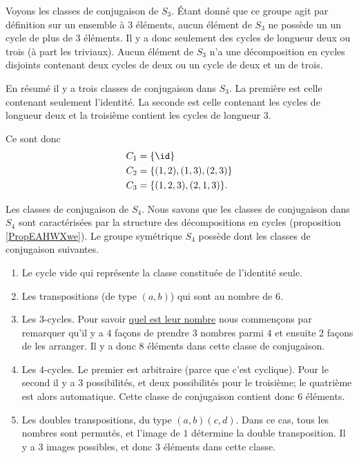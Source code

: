 \begin{example}     \label{EXooQAXRooBsPURs}
    Voyons les classes de conjugaison de \( S_3\). Étant donné que ce groupe agit par définition sur un ensemble à \( 3\) éléments, aucun élément de \( S_3\) ne possède un un cycle de plus de \( 3\) éléments. Il y a donc seulement des cycles de longueur deux ou trois (à part les triviaux). Aucun élément de \( S_3\) n'a une décomposition en cycles disjoints contenant deux cycles de deux ou un cycle de deux et un de trois.

    En résumé il y a trois classes de conjugaison dans \( S_3\). La première est celle contenant seulement l'identité. La seconde est celle contenant les cycles de longueur deux et la troisième contient les cycles de longueur \( 3\).

    Ce sont donc
    \begin{subequations}
        \begin{align}
            C_1&=\{ \id \}\\
            C_2&=\{ (1,2),(1,3),(2,3) \}\\
            C_3&=\{ (1,2,3),(2,1,3) \}.
        \end{align}
    \end{subequations}
\end{example}

\begin{example} \label{ExVYZPzub}
    Les classes de conjugaison de \( S_4\). Nous savons que les classes de conjugaison dans \( S_4\) sont caractérisées par la structure des décompositions en cycles (proposition \ref{PropEAHWXwe}). Le groupe symétrique \( S_4\) possède dont les classes de conjugaison suivantes.
\begin{enumerate}
    \item
        Le cycle vide qui représente la classe constituée de l'identité seule.
    \item
        Les transpositions (de type \( (a,b)\)) qui sont au nombre de \( 6\).
    \item
        Les \( 3\)-cycles. Pour savoir \href{http://www.toujourspret.com/techniques/expression/chants/C/cantique_des_etoiles.php}{quel est leur nombre} nous commençons par remarquer qu'il y a \( 4\) façons de prendre \( 3\) nombres parmi \( 4\) et ensuite \( 2\) façons de les arranger. Il y a donc \( 8\) éléments dans cette classe de conjugaison.
    \item
        Les \( 4\)-cycles. Le premier est arbitraire (parce que c'est cyclique). Pour le second il y a \( 3\) possibilités, et deux possibilités pour le troisième; le quatrième est alors automatique. Cette classe de conjugaison contient donc \( 6\) éléments.
    \item       \label{ITEMooGCMYooKZgFHX}
        Les doubles transpositions, du type \( (a,b)(c,d)\). Dans ce cas, tous les nombres sont permutés, et l'image de $1$ détermine la double transposition. Il y a $3$ images possibles, et donc \( 3\) éléments dans cette classe.
\end{enumerate}
\end{example}

